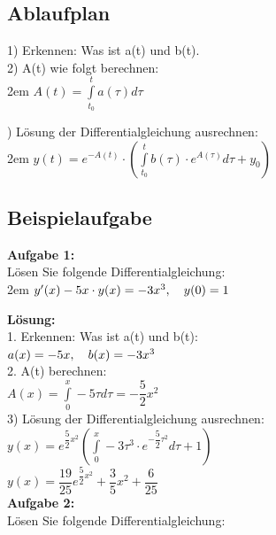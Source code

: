 \documentclass[11pt,final]{scrreprt}
\newcommand{\br} {\medskip\\}
\begin{document}
\subsection*{Ablaufplan}

1) Erkennen: Was ist a(t) und b(t).\br
2) A(t) wie folgt berechnen:\\

\begingroup
\leftskip2em 
$ A(t) = \int\limits_{t_0}^t a(\tau) d\tau $\\
\par	
{}) Lösung der Differentialgleichung ausrechnen:\\

\begingroup
\leftskip2em 
$ y(t) = e^{-A(t)}\cdot\left(\int\limits_{t_0}^tb(\tau)\cdot e^{A(\tau)}d\tau +y_0\right)$\\
\par	
\endgroup 
\subsection*{Beispielaufgabe}
\textbf{Aufgabe 1:}\\
Lösen Sie folgende Differentialgleichung:\\

\begingroup
\leftskip2em 
$ y'(x)-5x\cdot y(x) = -3x^3, \hspace*{1em} y(0)=1 $\\
\par	
\endgroup 
\textbf{Lösung:}\br
1. Erkennen: Was ist a(t) und b(t):\\
\hspace*{2em}$ a(x) = -5x , \hspace*{1em}b(x) = -3x^3 $\\
2. A(t) berechnen:\\
\hspace*{2em}$ A(x) = \int\limits_0^x -5\tau d\tau = -\dfrac{5}{2}x^2 $\\
3) Lösung der Differentialgleichung ausrechnen:\\
\hspace*{2em}$ y(x) = e^{\dfrac{5}{2}x^2}\left( \int\limits_0^x -3\tau^3\cdot e^{-\dfrac{5}{2}\tau^2} d\tau + 1 \right)$\\
\hspace*{2em}$ y(x) = \dfrac{19}{25}e^{\dfrac{5}{2}x^2}+\dfrac{3}{5}x^2+\dfrac{6}{25} $\br

\textbf{Aufgabe 2:}\\
Lösen Sie folgende Differentialgleichung:\\
\end{document}
